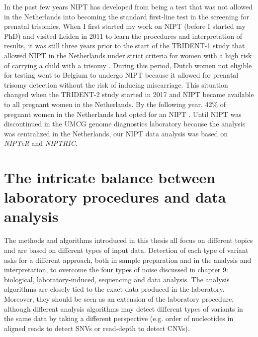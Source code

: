 In the past few years NIPT has developed from being a test that was not allowed in the Netherlands into becoming the standard first-line test in the screening for prenatal trisomies. 
When I first started my work on NIPT (before I started my PhD) and visited Leiden in 2011 to learn the procedures and interpretation of results, it was still three years prior to the start of the TRIDENT-1
study that allowed NIPT in the Netherlands under strict criteria for women with a high risk of carrying a child with a trisomy \cite{meeroverNIPT_2018}. 
During this period, Dutch women not eligible for testing went to Belgium to undergo NIPT \cite{Visser_2014} because it allowed for prenatal trisomy detection without the risk of inducing miscarriage. 
This situation changed when the TRIDENT-2 study started in 2017 and NIPT became available to all pregnant women in the Netherlands. 
By the following year, 42\% of pregnant women in the Netherlands had opted for an NIPT \cite{niptconsortium_2018}. 
Until NIPT was discontinued in the UMCG genome diagnostics laboratory because the analysis was centralized in the Netherlands, our NIPT data analysis was based on \textsl{NIPTeR} and \textsl{NIPTRIC}.

\section[Balancing laboratory procedures and data analysis]{The intricate balance between laboratory \newline procedures and data analysis}\label{Balance}
The methods and algorithms introduced in this thesis all focus on different topics and are based on different types of input data. 
Detection of each type of variant asks for a different approach, both in sample preparation and in the analysis and interpretation, to overcome the four types of noise 
discussed in chapter 9: biological, laboratory-induced, sequencing and data analysis. 
The analysis algorithms are closely tied to the exact data produced in the laboratory. 
Moreover, they should be seen as an extension of the laboratory procedure, although different analysis algorithms may detect different types of variants in the same data by taking a different perspective (e.g. order of
nucleotides in aligned reads to detect SNVs or read-depth to detect CNVs). 

